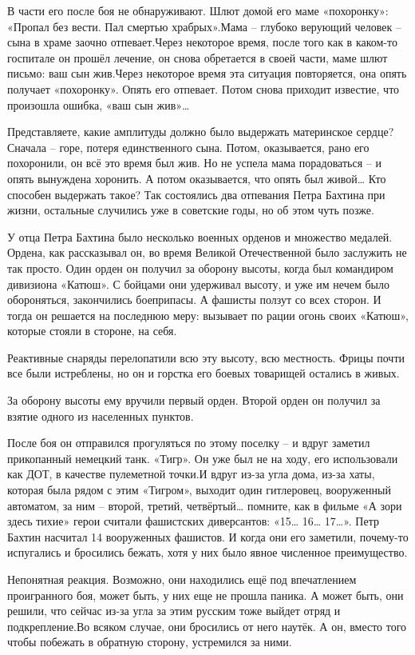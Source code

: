 В части его после боя не обнаруживают. Шлют домой его маме «похоронку»: «Пропал без вести. Пал смертью храбрых».Мама – глубоко верующий человек – сына в храме заочно отпевает.Через некоторое время, после того как в каком-то госпитале он прошёл лечение, он снова обретается в своей части, маме шлют письмо: ваш сын жив.Через некоторое время эта ситуация повторяется, она опять получает «похоронку». Опять его отпевает. Потом снова приходит известие, что произошла ошибка, «ваш сын жив»…

Представляете, какие амплитуды должно было выдержать материнское сердце? Сначала – горе, потеря единственного сына. Потом, оказывается, рано его похоронили, он всё это время был жив. Но не успела мама порадоваться – и опять вынуждена хоронить. А потом оказывается, что опять был живой… Кто способен выдержать такое?
Так состоялись два отпевания Петра Бахтина при жизни, остальные случились уже в советские годы, но об этом чуть позже.

У отца Петра Бахтина было несколько военных орденов и множество медалей. Ордена, как рассказывал он, во время Великой Отечественной было заслужить не так просто. Один орден он получил за оборону высоты, когда был командиром дивизиона «Катюш». С бойцами они удерживал высоту, и уже им нечем было обороняться, закончились боеприпасы. А фашисты ползут со всех сторон. И тогда он решается на последнюю меру: вызывает по рации огонь своих «Катюш», которые стояли в стороне, на себя.

Реактивные снаряды перелопатили всю эту высоту, всю местность. Фрицы почти все были истреблены, но он и горстка его боевых товарищей остались в живых.

За оборону высоты ему вручили первый орден.
Второй орден он получил за взятие одного из населенных пунктов.

После боя он отправился прогуляться по этому поселку – и вдруг заметил прикопанный немецкий танк. «Тигр». Он уже был не на ходу, его использовали как ДОТ, в качестве пулеметной точки.И вдруг из-за угла дома, из-за хаты, которая была рядом с этим «Тигром», выходит один гитлеровец, вооруженный автоматом, за ним – второй, третий, четвёртый… помните, как в фильме «А зори здесь тихие» герои считали фашистских диверсантов: «15… 16… 17…». Петр Бахтин насчитал 14 вооруженных фашистов. И когда они его заметили, почему-то испугались и бросились бежать, хотя у них было явное численное преимущество.

Непонятная реакция. Возможно, они находились ещё под впечатлением проигранного боя, может быть, у них еще не прошла паника. А может быть, они решили, что сейчас из-за угла за этим русским тоже выйдет отряд и подкрепление.Во всяком случае, они бросились от него наутёк. А он, вместо того чтобы побежать в обратную сторону, устремился за ними.

